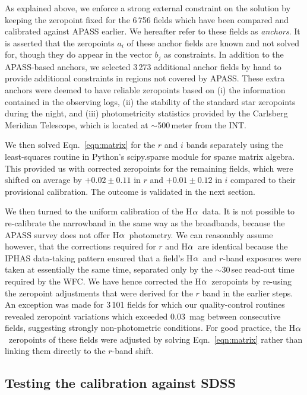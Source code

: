 \documentclass[useAMS,usenatbib]{mn2e}
\def\ha{\mbox{H$\rm \alpha$}}
\begin{document}
As explained above, we enforce a strong external constraint
on the solution by keeping the zeropoint fixed 
for the 6\,756 fields which have been compared
and calibrated against APASS earlier.
We hereafter refer to these fields as \emph{anchors}.
It is asserted that the zeropoints $a_i$ of these anchor fields 
are known and not solved for,
though they do appear in the vector $b_j$ as constraints.
In addition to the APASS-based anchors, 
we selected 3\,273 additional anchor fields by hand
to provide additional constraints in regions not covered by APASS.
These extra anchors were deemed to have reliable zeropoints 
based on 
(i) the information contained in the observing logs,
(ii) the stability of the standard star zeropoints during the night, and
(iii) photometricity statistics provided by the Carlsberg Meridian Telescope,
which is located at $\sim$500\,meter from the INT.

We then solved Eqn.~\ref{eqn:matrix} for the $r$ and $i$ bands
separately using the least-squares routine 
in Python's {\sc scipy.sparse} module for sparse matrix algebra.
This provided us with corrected zeropoints for the remaining fields,
which were shifted on average by $+0.02\pm0.11$ in $r$ 
and $+0.01\pm0.12$ in $i$ compared to their provisional calibration.
The outcome is validated in the next section.

We then turned to the uniform calibration of the \ha\ data.
It is not possible to re-calibrate the narrowband 
in the same way as the broadbands,
because the APASS survey does not offer \ha\ photometry.
We can reasonably assume however,
that the corrections required for $r$ and \ha\ are identical
because the IPHAS data-taking pattern ensured 
that a field's \ha\ and $r$-band exposures
were taken at essentially the same time, 
separated only by the $\sim$30\,sec read-out time required by the WFC.
We have hence corrected the \ha\ zeropoints 
by re-using the zeropoint adjustments that were derived for the $r$ band
in the earlier steps.
An exception was made for 3\,101 fields
for which our quality-control routines revealed
zeropoint variations which exceeded 0.03~mag 
between consecutive fields,
suggesting strongly non-photometric conditions.
For good practice, the \ha\ zeropoints of these fields
were adjusted by solving Eqn.~\ref{eqn:matrix}
rather than linking them directly to the $r$-band shift.

\subsection{Testing the calibration against SDSS}
\end{document}
